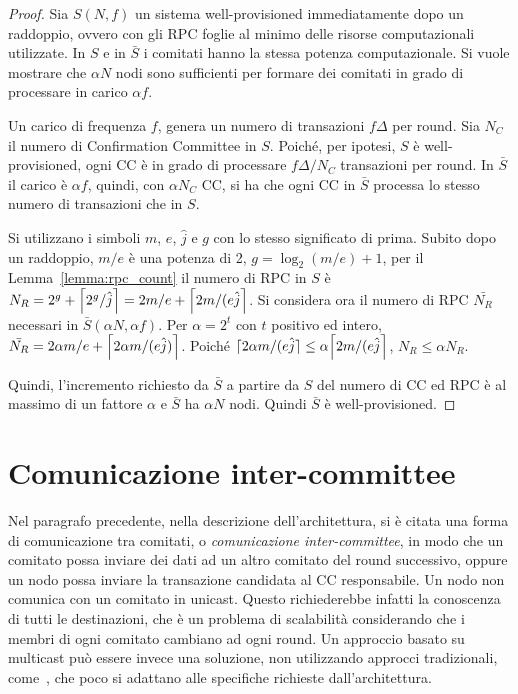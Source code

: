 \begin{proof}
Sia $S(N, f)$ un sistema well-provisioned immediatamente dopo un raddoppio, ovvero con gli RPC foglie al minimo delle risorse computazionali utilizzate. In $S$ e in $\bar{S}$ i comitati hanno la stessa potenza computazionale. Si vuole mostrare che $\alpha N$ nodi sono sufficienti per formare dei comitati in grado di processare in carico $\alpha f$.

Un carico di frequenza $f$, genera un numero di transazioni $f \Delta$ per round. Sia $N_C$ il numero di Confirmation Committee in $S$. Poiché, per ipotesi, $S$ è well-provisioned, ogni CC è in grado di processare $f \Delta / N_C$ transazioni per round. In $\bar{S}$ il carico è $\alpha f$, quindi, con $\alpha N_C$ CC, si ha che ogni CC in $\bar{S}$ processa lo stesso numero di transazioni che in $S$.

Si utilizzano i simboli $m$, $e$, $\hat{j}$ e $g$ con lo stesso significato di prima.
Subito dopo un raddoppio, $m/e$ è una potenza di 2, $g= \log_2 (m/e) +1$, per il Lemma~\ref{lemma:rpc_count} il numero di RPC in $S$ è $N_R = 2^g + \ceil*{2^g/\hat{j}} = 2m/e + \ceil*{2 m/ (e \hat{j}}$. Si considera ora il numero di RPC $\bar{N_R}$ necessari in $\bar{S}(\alpha N, \alpha f)$. Per $\alpha = 2^t$ con $t$ positivo ed intero, $\bar{N_R} = 2 \alpha m / e + \ceil*{2 \alpha m / (e \hat{j})}$. Poiché $\ceil{2 \alpha m/(e \hat{j}} \leq \alpha \ceil*{2 m / (e \hat{j}}$, $N_R \leq \alpha N_R$.

Quindi, l'incremento richiesto da $\bar{S}$ a partire da $S$ del numero di CC ed RPC è al massimo di un fattore $\alpha$ e $\bar{S}$ ha $\alpha N$ nodi. Quindi $\bar{S}$ è well-provisioned.
\end{proof}


\section{Comunicazione inter-committee}

Nel paragrafo precedente, nella descrizione dell'architettura, si è citata una forma di comunicazione tra comitati, o \emph{comunicazione inter-committee}, in modo che un comitato possa inviare dei dati ad un altro comitato del round successivo, oppure un nodo possa inviare la transazione candidata al CC responsabile.
Un nodo non comunica con un comitato in unicast. Questo richiederebbe infatti la conoscenza di tutti le destinazioni, che è un problema di scalabilità considerando che i membri di ogni comitato cambiano ad ogni round. Un approccio basato su multicast può essere invece una soluzione, non utilizzando approcci tradizionali, come~, che poco si adattano alle specifiche richieste dall'architettura.

